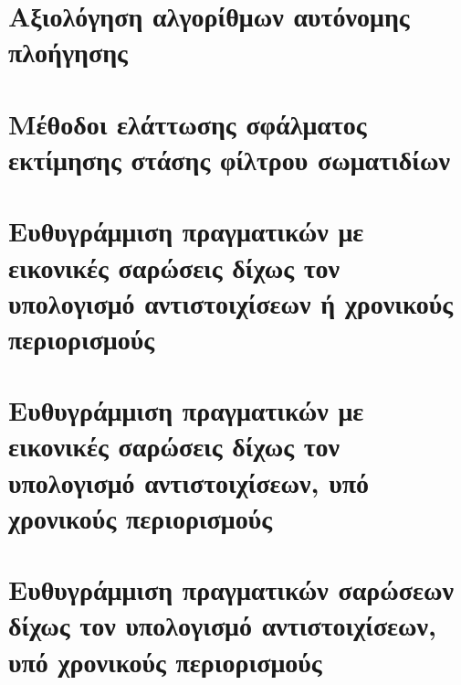 \chapter{Αξιολόγηση αλγορίθμων αυτόνομης πλοήγησης}
  \label{part:02:chapter:01}
  

\chapter{Μέθοδοι ελάττωσης σφάλματος εκτίμησης στάσης φίλτρου σωματιδίων}
  \label{part:02:chapter:02}
  

\chapter{Ευθυγράμμιση πραγματικών με εικονικές σαρώσεις δίχως τον υπολογισμό αντιστοιχίσεων ή χρονικούς περιορισμούς}
  \label{part:02:chapter:03}
  

\chapter{Ευθυγράμμιση πραγματικών με εικονικές σαρώσεις δίχως τον υπολογισμό αντιστοιχίσεων, υπό χρονικούς περιορισμούς}
  \label{part:02:chapter:04}
  

\chapter{Ευθυγράμμιση πραγματικών σαρώσεων δίχως τον υπολογισμό αντιστοιχίσεων, υπό χρονικούς περιορισμούς}
  \label{part:02:chapter:05}
  
